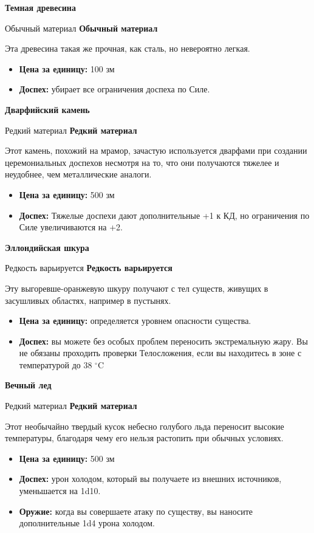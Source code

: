 \documentclass[a4paper, 9pt, twocolumn]{book}
\newcommand{\partc}[2][]{{
		\bigskip
		\noindent
		\hspace{-0.25cm}
		\fontsize{11pt}{13.2}
		\color{sectioncolor}
		\textbf{#2}}
	
	{
		\ifx\relax#1\relax
		\else
		\noindent
		\normalcolor
		\textbf{#1}}
	\bigskip
	\fi
}
\begin{document}
	\partc[Обычный материал]{Темная древесина}
	
	\noindent Эта древесина такая же прочная, как сталь, но невероятно легкая.
	
	\begin{itemize}
		\item \textbf{Цена за единицу:} 100 зм
		
		\item \textbf{Доспех:} убирает все ограничения доспеха по Силе.
	\end{itemize}

	\partc[Редкий материал]{Дварфийский камень}
	
	\noindent Этот камень, похожий на мрамор, зачастую используется дварфами при создании церемониальных доспехов несмотря на то, что они получаются тяжелее и неудобнее, чем металлические аналоги.
	
	\begin{itemize}
		\item \textbf{Цена за единицу:} 500 зм
		
		\item \textbf{Доспех:} Тяжелые доспехи дают дополнительные +1 к КД, но ограничения по Силе увеличиваются на +2.
	\end{itemize}

	\partc[Редкость варьируется]{Эллондийская шкура}
	
	\noindent Эту выгоревше-оранжевую шкуру получают с тел существ, живущих в засушливых областях, например в пустынях.
	
	\begin{itemize}
		\item \textbf{Цена за единицу:} определяется уровнем опасности существа.
		
		\item \textbf{Доспех:} вы можете без особых проблем переносить экстремальную жару. Вы не обязаны проходить проверки Телосложения, если вы находитесь в зоне с температурой до 38 $^\circ$C
	\end{itemize}

	\partc[Редкий материал]{Вечный лед}
	
	\noindent Этот необычайно твердый кусок небесно голубого льда переносит высокие температуры, благодаря чему его нельзя растопить при обычных условиях.
	
	\begin{itemize}
		\item \textbf{Цена за единицу:} 500 зм
		
		\item \textbf{Доспех:} урон холодом, который вы получаете из внешних источников, уменьшается на 1d10.
		
		\item \textbf{Оружие:} когда вы совершаете атаку по существу, вы наносите дополнительные 1d4 урона холодом.
	\end{itemize}
\end{document}
